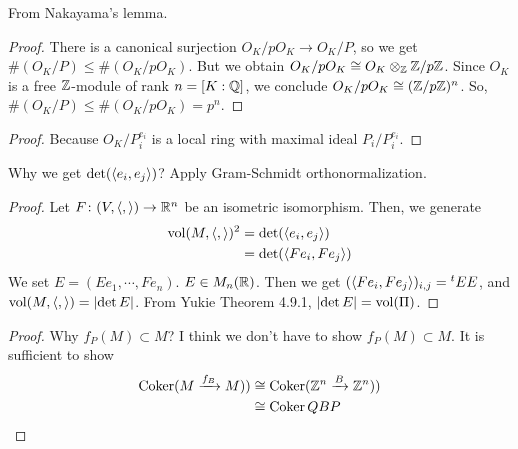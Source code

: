 \begin{rem}
  From Nakayama's lemma.
\end{rem}


\begin{proof}
There is a canonical surjection $O_K/pO_K \to O_K /P$, so we get $\# (O_K /P) \leq \# (O_K/pO_K)$. But we obtain $O_K/pO_K \cong O_K \otimes_{{\mathbb Z}} {\mathbb Z} / p {\mathbb Z}$. Since $O_K$ is a free ${\mathbb Z}$-module of rank $n = [K:{\mathbb Q}]$, we conclude $O_K/pO_K \cong ({\mathbb Z} / p {\mathbb Z} )^n $. So, $\# (O_K /P) \leq \# (O_K/pO_K) = p^n$.
\end{proof}



\barquo{
\[
\bigoplus_{i=1}^r O_K/P_i^{e_i} = \bigoplus_{i=1}^r (O_K/P_i^{e_i})_{P_i}
\]
}
\begin{proof}
  Because $O_K/P_i^{e_i}$ is a local ring with maximal ideal $P_i/P_i^{e_i}$.
\end{proof}


\begin{rem}
  Why we get $\det (\langle e_i,e_j \rangle)$? Apply Gram-Schmidt orthonormalization.
\end{rem}


\begin{proof}
  Let $F \colon (V, \langle , \rangle) \to {\mathbb R}^n$ be  an isometric isomorphism. Then, we generate
  \begin{align*}
    \operatorname{vol} (M, \langle , \rangle )^2 &= \det (\langle e_i,e_j \rangle) \\
    &= \det (\langle Fe_i,Fe_j \rangle)
  \end{align*}
  We set $E = (Ee_1, \cdots, Fe_n)$. $E \in M_n({\mathbb R})$. Then we get $( \langle Fe_i,Fe_j \rangle)_{i,j} = {}^tE E$, and $\operatorname{vol} (M, \langle , \rangle ) = \left \lvert \det E  \right \rvert$. From Yukie\cite{雪江線形} Theorem 4.9.1, $\left \lvert \det E  \right \rvert = \operatorname{vol}(\Pi)$.
\end{proof}


\barquo{
\[
\# (\Coker (M \xrightarrow{f_B} M) ) = \# (\Coker (M \xrightarrow{f_Q} M \xrightarrow{f_B} M \xrightarrow{f_P} M ) )
\]
}
\begin{proof}
  Why $f_P(M) \subset M$? I think we don't have to show $f_P(M) \subset M$. It is sufficient to show
  \begin{align*}
    \operatorname{Coker} (M \xrightarrow{f_B} M) ) &\cong   \operatorname{Coker} ({\mathbb Z}^n \xrightarrow{B} {\mathbb Z}^n) ) \\
    &\cong \operatorname{Coker} QBP
  \end{align*}
\end{proof}



